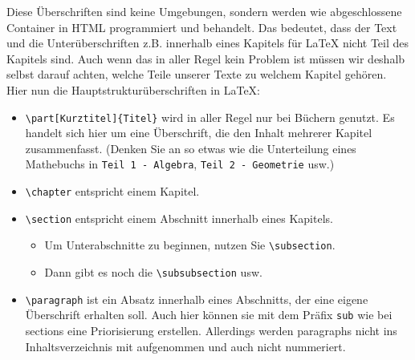 Diese Überschriften sind keine Umgebungen, sondern werden wie abgeschlossene Container in HTML programmiert und behandelt. Das bedeutet, dass der Text und die Unterüberschriften z.B. innerhalb eines Kapitels für LaTeX nicht Teil des Kapitels sind. Auch wenn das in aller Regel kein Problem ist müssen wir deshalb selbst darauf achten, welche Teile unserer Texte zu welchem Kapitel gehören.\\

Hier nun die Hauptstrukturüberschriften in LaTeX:

\begin{itemize}
	\item \verb|\part[Kurztitel]{Titel}| wird in aller Regel nur bei Büchern genutzt. Es handelt sich hier um eine Überschrift, die den Inhalt mehrerer Kapitel zusammenfasst. (Denken Sie an so etwas wie die Unterteilung eines Mathebuchs in \verb|Teil 1 - Algebra|, \verb|Teil 2 - Geometrie| usw.)
	\item \verb|\chapter| entspricht einem Kapitel.
	\item \verb|\section| entspricht einem Abschnitt innerhalb eines Kapitels.
	\begin{itemize}
		\item Um Unterabschnitte zu beginnen, nutzen Sie \verb|\subsection|.
		\item Dann gibt es noch die \verb|\subsubsection| usw.
	\end{itemize}
	\item \verb|\paragraph| ist ein Absatz innerhalb eines Abschnitts, der eine eigene Überschrift erhalten soll. Auch hier können sie mit dem Präfix \verb|sub| wie bei sections eine Priorisierung erstellen. Allerdings werden paragraphs nicht ins Inhaltsverzeichnis mit aufgenommen und auch nicht nummeriert.
\end{itemize}

